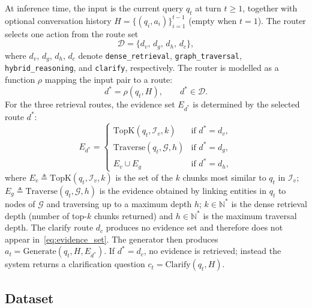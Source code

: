 At inference time, the input is the current query $q_t$ at turn $t\geq 1$,
together with optional conversation history $H=\{(q_i,a_i)\}_{i=1}^{t-1}$
(empty when $t=1$). The router selects one action from the route set
\begin{equation}
\mathcal{D}=\{d_v,\,d_g,\,d_h,\,d_c\},
\label{eq:route_set}
\end{equation}
where $d_v$, $d_g$, $d_h$, $d_c$ denote \texttt{dense\_retrieval},
\texttt{graph\_traversal}, \texttt{hybrid\_reasoning}, and \texttt{clarify},
respectively. The router is modelled as a function $\rho$ mapping the input
pair to a route:
\begin{equation}
d^* = \rho(q_t,H),\qquad d^*\in\mathcal{D}.
\label{eq:routing_function}
\end{equation}
For the three retrieval routes, the evidence set $E_{d^*}$ is determined by
the selected route $d^*$:
\begin{equation}
E_{d^*}=
\begin{cases}
\mathrm{TopK}(q_t,\mathcal{I}_v,k) & \text{if } d^*=d_v,\\[3pt]
\mathrm{Traverse}(q_t,\mathcal{G},h) & \text{if } d^*=d_g,\\[3pt]
E_v\cup E_g & \text{if } d^*=d_h,
\end{cases}
\label{eq:evidence_set}
\end{equation}
where $E_v\triangleq\mathrm{TopK}(q_t,\mathcal{I}_v,k)$ is the set of the $k$
chunks most similar to $q_t$ in $\mathcal{I}_v$;
$E_g\triangleq\mathrm{Traverse}(q_t,\mathcal{G},h)$ is the evidence obtained
by linking entities in $q_t$ to nodes of $\mathcal{G}$ and traversing up to a
maximum depth $h$; $k\in\mathbb{N}^{*}$ is the dense retrieval depth (number
of top-$k$ chunks returned) and $h\in\mathbb{N}^{*}$ is the maximum traversal
depth. The clarify route $d_c$ produces no evidence set and therefore does
not appear in~\eqref{eq:evidence_set}. The generator then produces
$a_t=\mathrm{Generate}(q_t,H,E_{d^*})$. If $d^*=d_c$, no evidence is
retrieved; instead the system returns a clarification question
$c_t=\mathrm{Clarify}(q_t,H)$.

\subsection{Dataset}\label{subsec:dataset}

